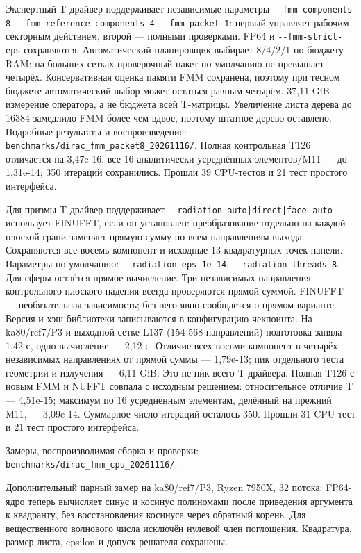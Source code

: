 \documentclass[
  russian,
  11pt,
  a4paper,
]{report}
\begin{document}
Экспертный T-драйвер поддерживает независимые параметры
\nolinkurl{--fmm-components 8 --fmm-reference-components 4 --fmm-packet 1}:
первый управляет рабочим секторным действием, второй --- полными
проверками. FP64 и \nolinkurl{--fmm-strict-eps} сохраняются.
Автоматический планировщик выбирает 8/4/2/1 по бюджету RAM; на больших
сетках проверочный пакет по умолчанию не превышает четырёх.
Консервативная оценка памяти FMM сохранена, поэтому при тесном бюджете
автоматический выбор может остаться равным четырём. 37,11 GiB ---
измерение оператора, а не бюджета всей T-матрицы. Увеличение листа
дерева до 16384 замедлило FMM более чем вдвое, поэтому штатное дерево
оставлено. Подробные результаты и воспроизведение:
\nolinkurl{benchmarks/dirac_fmm_packet8_20261116/}. Полная контрольная
T126 отличается на 3,47e-16, все 16 аналитически усреднённых
элементов/M11 --- до 1,31e-14; 350 итераций сохранились. Прошли 39
CPU-тестов и 21 тест простого интерфейса.

Для призмы T-драйвер поддерживает
\nolinkurl{--radiation auto|direct|face}. \nolinkurl{auto} использует
FINUFFT, если он установлен: преобразование отдельно на каждой плоской
грани заменяет прямую сумму по всем направлениям выхода. Сохраняются все
восемь компонент и исходные 13 квадратурных точек панели. Параметры по
умолчанию: \nolinkurl{--radiation-eps 1e-14},
\nolinkurl{--radiation-threads 8}. Для сферы остаётся прямое вычисление.
Три независимых направления контрольного плоского падения всегда
проверяются прямой суммой. FINUFFT --- необязательная зависимость; без
него явно сообщается о прямом варианте. Версия и хэш библиотеки
записываются в конфигурацию чекпоинта. На ka80/ref7/P3 и выходной сетке
L137 (154 568 направлений) подготовка заняла 1,42 с, одно вычисление ---
2,12 с. Отличие всех восьми компонент в четырёх независимых направлениях
от прямой суммы --- 1,79e-13; пик отдельного теста геометрии и излучения
--- 6,11 GiB. Это не пик всего T-драйвера. Полная T126 с новым FMM и
NUFFT совпала с исходным решением: относительное отличие T --- 4,51e-15;
максимум по 16 усреднённым элементам, делённый на прежний M11, ---
3,09e-14. Суммарное число итераций осталось 350. Прошли 31 CPU-тест и 21
тест простого интерфейса.

Замеры, воспроизводимая сборка и проверки:
\nolinkurl{benchmarks/dirac_fmm_cpu_20261116/}.

Дополнительный парный замер на ka80/ref7/P3, Ryzen 7950X, 32 потока:
FP64-ядро теперь вычисляет синус и косинус полиномами после приведения
аргумента к квадранту, без восстановления косинуса через обратный
корень. Для вещественного волнового числа исключён нулевой член
поглощения. Квадратура, размер листа, epsilon и допуск решателя
сохранены.
\end{document}
